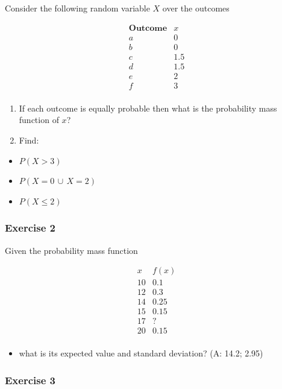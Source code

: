 \documentclass[
]{book}
\providecommand{\tightlist}{%
  \setlength{\itemsep}{0pt}\setlength{\parskip}{0pt}}
\begin{document}
Consider the following random variable \(X\) over the outcomes

\[
\begin{array}{cc}
\textbf{Outcome} & x \\
a & 0 \\
b & 0 \\
c & 1.5 \\
d & 1.5 \\
e & 2 \\
f & 3 \\
\end{array}
\]

\begin{enumerate}
\def\labelenumi{\alph{enumi})}
\item
  If each outcome is equally probable then what is the probability mass function of \(x\)?
\item
  Find:
\end{enumerate}

\begin{itemize}
\tightlist
\item
  \(P(X>3)\)
\item
  \(P(X=0\, \cup \, X=2 )\)
\item
  \(P(X \leq 2)\)
\end{itemize}

\hypertarget{exercise-2-2}{%
\subsubsection{Exercise 2}\label{exercise-2-2}}

Given the probability mass function

\[
\begin{array}{cc}
x & f(x) \\ 
10 & 0.1 \\ 
12 & 0.3 \\ 
14 & 0.25 \\ 
15 & 0.15 \\ 
17 & ? \\ 
20 & 0.15 \\ 
\end{array}
\]

\begin{itemize}
\tightlist
\item
  what is its expected value and standard deviation? (A: 14.2; 2.95)
\end{itemize}

\hypertarget{exercise-3-2}{%
\subsubsection{Exercise 3}\label{exercise-3-2}}
\end{document}
